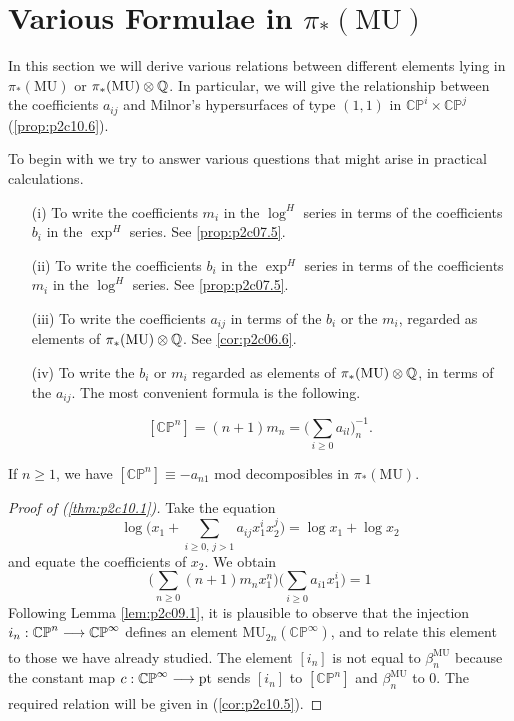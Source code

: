 \documentclass[../main]{subfiles}
\begin{document}
\label{sec:p2c10}
\chapter{Various Formulae in $\pi_\ast(\mathrm{MU})$}
In this section we will derive various relations between different elements lying in $\pi_\ast(\mathrm{MU})$ or $\pi_\ast(\mathrm{MU}) \otimes \mathbb{Q}$. In particular, we will give the relationship between the coefficients $a_{ij}$ and Milnor's hypersurfaces of type $(1,1)$ in $\mathbb {CP}^i \times \mathbb {CP}^j$ (\ref{prop:p2c10.6}).

To begin with we try to answer various questions that might arise in practical calculations.

\begin{enumerate}
    \item[(i)] To write the coefficients $m_i$ in the $\log^H$ series in terms of the coefficients $b_i$ in the $\exp^H$ series. See \ref{prop:p2c07.5}.
    \item[(ii)] To write the coefficients $b_i$ in the $\exp^H$ series in terms of the coefficients $m_i$ in the $\log^H$ series. See \ref{prop:p2c07.5}.
    \item[(iii)] To write the coefficients $a_{ij}$ in terms of the $b_i$ or the $m_i$, regarded as elements of $\pi_\ast(\mathrm{MU}) \otimes \mathbb{Q}$. See \eqref{cor:p2c06.6}.
    \item[(iv)] To write the $b_i$ or $m_i$ regarded as elements of $\pi_\ast(\mathrm {MU}) \otimes \mathbb{Q}$, in terms of the $a_{ij}$. The most convenient formula is the following. 
\end{enumerate}

\begin{theorem}
\label{thm:p2c10.1}
\begin{equation}
        \tag{10.1}
        [\mathbb {CP}^n] = (n + 1)m_n = \bigg(\sum_{i \ge 0} a_{il}\bigg)_n^{-1}.
\end{equation}
\end{theorem}

\begin{corollary}
\label{cor:p2c10.2}
If $n \ge 1$, we have $[\mathbb {CP}^n] \equiv -a_{n1}$ mod decomposibles in $\pi_\ast(\mathrm{MU})$.
\end{corollary}

\begin{proof}[Proof of (\ref{thm:p2c10.1})]
Take the equation \[\log \bigg(x_1 + \sum_{i \ge 0, \, j > 1} a_{ij} x_1^i x_2^j\bigg) = \log x_1 + \log x_2\] and equate the coefficients of $x_2$. We obtain \[\bigg(\sum_{n \ge 0} (n + 1) m_n x_1^n\bigg) \bigg(\sum_{i \ge 0} a_{i1} x_1^i\bigg) = 1\] Following Lemma \ref{lem:p2c09.1}, it is plausible to observe that the injection $i_n : \mathbb {CP}^n \lar{} \mathbb {CP}^\infty$ defines an element $\mathrm {MU}_{2n} (\mathbb {CP}^\infty)$, and to relate this element to those we have already studied. The element $[i_n]$ is not equal to $\beta_n^{\mathrm{MU}}$ because the constant map $c : \mathbb{CP}^\infty \lar{} \mathrm{pt}$ sends $[i_n]$ to $[\mathbb {CP}^n]$ and $\beta_n^{\mathrm{MU}}$ to $0$. The required relation will be given in (\ref{cor:p2c10.5}).
\end{proof}
\end{document}
